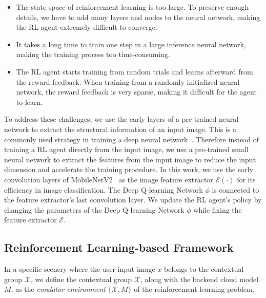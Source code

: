 \begin{itemize}
	\item The state space of reinforcement learning is too large. To preserve enough details, we have to add many layers and nodes to the neural network, making the RL agent extremely difficult to converge. 
	\item It takes a long time to train one step in a large inference neural network, making the training process too time-consuming.
	\item The RL agent starts training from random trials and learns afterward from the reward feedback. When training from a randomly initialized neural network, the reward feedback is very sparse, making it difficult for the agent to learn.
\end{itemize}

To address these challenges, we use the early layers of a pre-trained neural network to extract the structural information of an input image. This is a commonly used strategy in training a deep neural network~\cite{finetunning,finetunning2}. Therefore instead of training a RL agent directly from the input image, we use a pre-trained small neural network to extract the features from the input image to reduce the input dimension and accelerate the training procedure. In this work, we use the early convolution layers of MobileNetV2~\cite{MobileNetV2} as the image feature extractor $ \mathcal{E}(\cdot) $ for its efficiency in image classification. The Deep Q-learning Network $ \phi $ is connected to the feature extractor's last convolution layer. We update the RL agent's policy by changing the parameters of the Deep Q-learning Network $ \phi $ while fixing the feature extractor $ \mathcal{E} $. %

\subsection{Reinforcement Learning-based Framework}

In a specific scenery where the user input image $ x $ belongs to the contextual group $ \mathcal{X} $, we define the contextual group $ \mathcal{X} $, along with the backend cloud model $ M $, as the \emph{emulator environment} $ \{\mathcal{X}, M\} $ of the reinforcement learning problem. 


